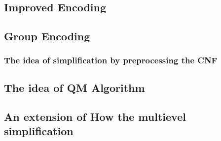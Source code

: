 \documentclass{article}
\begin{document}
\subsection{Improved Encoding}

\subsection{Group Encoding}
\subsubsection{The idea of simplification by preprocessing the CNF}
\subsection{The idea of QM Algorithm}
\subsection{An extension of How the multievel simplification }
\end{document}
